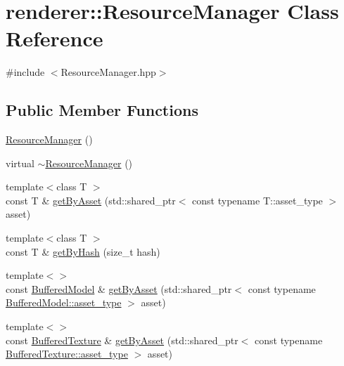 \hypertarget{classrenderer_1_1ResourceManager}{\section{renderer\-:\-:Resource\-Manager Class Reference}
\label{classrenderer_1_1ResourceManager}
}


{\ttfamily \#include $<$Resource\-Manager.\-hpp$>$}

\subsection*{Public Member Functions}
\begin{DoxyCompactItemize}
\item 
\hyperlink{classrenderer_1_1ResourceManager_a1009bbc0fd5568117a46445dc19b175e}{Resource\-Manager} ()
\item 
virtual \hyperlink{classrenderer_1_1ResourceManager_a9e35f0ffa32fb7abc96d789020a88704}{$\sim$\-Resource\-Manager} ()
\item 
{\footnotesize template$<$class T $>$ }\\const T \& \hyperlink{classrenderer_1_1ResourceManager_ae03d0505ae291baeb2e30a03df589789}{get\-By\-Asset} (std\-::shared\-\_\-ptr$<$ const typename T\-::asset\-\_\-type $>$ asset)
\item 
{\footnotesize template$<$class T $>$ }\\const T \& \hyperlink{classrenderer_1_1ResourceManager_a6c041fb91f2c58228a2c1d8ea00de508}{get\-By\-Hash} (size\-\_\-t hash)
\item 
{\footnotesize template$<$$>$ }\\const \hyperlink{classrenderer_1_1BufferedModel}{Buffered\-Model} \& \hyperlink{classrenderer_1_1ResourceManager_a63c0a1a51b61279fb1829aed0095d02c}{get\-By\-Asset} (std\-::shared\-\_\-ptr$<$ const typename \hyperlink{classrenderer_1_1BufferObject_a651cbaff8aa7148d72a9eaf71ad3636e}{Buffered\-Model\-::asset\-\_\-type} $>$ asset)
\item 
{\footnotesize template$<$$>$ }\\const \hyperlink{classrenderer_1_1BufferedTexture}{Buffered\-Texture} \& \hyperlink{classrenderer_1_1ResourceManager_ae1f4b125188a71efe7035e33683d7641}{get\-By\-Asset} (std\-::shared\-\_\-ptr$<$ const typename \hyperlink{classrenderer_1_1BufferObject_a651cbaff8aa7148d72a9eaf71ad3636e}{Buffered\-Texture\-::asset\-\_\-type} $>$ asset)
\item 

\end{DoxyCompactItemize}

